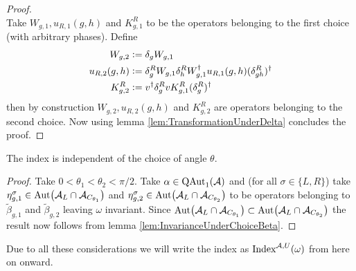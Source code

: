 \documentclass[11pt,a4paper,twoside]{article}
\numberwithin{equation}{section}
\begin{document}
\begin{proof}
\begin{equation}
	\end{equation}
	Take $W_{g,1},u_{R,1}(g,h)$ and $K^R_{g,1}$ to be the operators belonging to the first choice (with arbitrary phases). Define
	\begin{align}
		W_{g,2}&\defeq\delta_g W_{g,1}\\
		u_{R,2}(g,h)&\defeq \delta_g^R W_{g,1}\delta_h^R W_{g,1}^\dagger u_{R,1}(g,h)(\delta_{gh}^R)^\dagger\\
		K^R_{g,2}&\defeq v^\dagger \delta_g^R v K_{g,1}^R (\delta_g^R)^\dagger
	\end{align}
	then by construction $W_{g,2},u_{R,2}(g,h)$ and $K^R_{g,2}$ are operators belonging to the second choice. Now using lemma \ref{lem:TransformationUnderDelta} concludes the proof.
\end{proof}
\begin{lemma}
	The index is independent of the choice of angle $\theta$.
\end{lemma}
\begin{proof}
	Take $0<\theta_1<\theta_2<\pi/2$. Take $\alpha\in \QAut{\AA}$ and (for all $\sigma\in\{L,R\}$) take $\eta_{g,1}^\sigma\in\Aut{\AA_L\cap\AA_{C_{\theta_1}}}$ and $\eta_{g,2}^\sigma\in\Aut{\AA_L\cap\AA_{C_{\theta_2}}}$ to be operators belonging to $\tilde{\beta}_{g,1}$ and $\tilde{\beta}_{g,2}$ leaving $\omega$ invariant. Since $\Aut{\AA_L\cap\AA_{C_{\theta_1}}}\subset \Aut{\AA_L\cap\AA_{C_{\theta_2}}}$ the result now follows from lemma \ref{lem:InvarianceUnderChoiceBeta}.
\end{proof}
Due to all these considerations we will write the index as $\textrm{Index}^{\AA,U}(\omega)$ from here on onward.
\end{document}
